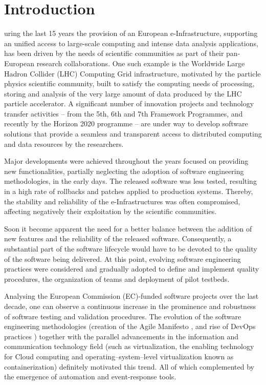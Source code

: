 \documentclass[journal]{IEEEtran}
\begin{document}
\IEEEpeerreviewmaketitle

\section{Introduction}

uring the last 15 years the provision of an European e-Infrastructure,
supporting an unified access to large-scale computing and intense data analysis
applications, has been driven by the needs of scientific communities as part of their
pan-European research collaborations. One such example is the Worldwide
Large Hadron Collider (LHC) Computing Grid infrastructure, motivated
by the particle physics scientific community, built to satisfy the computing needs
of processing, storing and analysis of the very large amount of data produced by the
LHC particle accelerator. A significant number of innovation projects and
technology transfer activities -- from the 5th, 6th and 7th Framework Programmes,
and recently by the Horizon 2020 programme \cite{h2020} -- are under way to
develop software solutions that provide a seamless and transparent access to distributed
computing and data resources by the researchers.

Major developments were achieved throughout the years focused on providing new
functionalities, partially neglecting the adoption of software engineering methodologies, in the early days.
The released software was less tested, resulting in a high rate of
rollbacks and patches applied to production systems. Thereby, the stability and
reliability of the e-Infrastructures was often compromised, affecting
negatively their exploitation by the scientific communities.

Soon it become apparent the need for a better balance between the addition of new features
and the reliability of the released software. Consequently, a substantial part of the
software lifecycle would have to be devoted to the quality of the software being
delivered. At this point, evolving software engineering practices were
considered and gradually adopted to define and implement quality procedures, the organization of teams
and deployment of pilot testbeds.

Analysing the European Commission (EC)-funded software projects over the last decade,
one can observe a continuous increase in the prominence and robustness of software
testing and validation procedures. The
evolution of the software engineering methodologies (creation of the Agile
Manifesto \cite{agile-manifesto}, and rise of DevOps practices \cite{zhu}) together
with the parallel advancements in the information and communication technology
field (such as virtualization, the enabling technology for Cloud computing and
operating--system--level virtualization known as containerization) definitely motivated this trend. All of which
complemented by the emergence of automation and event-response tools.
\end{document}
